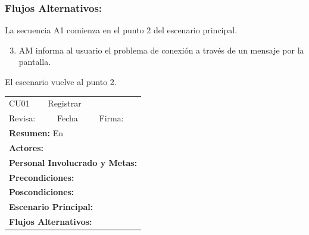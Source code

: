\begin{framed}
\subsubsection{Flujos Alternativos: }

La secuencia A1 comienza en el punto 2 del escenario principal.
\begin{enumerate}
    \setcounter{enumi}{2}
    \item AM informa al usuario el problema de conexión a través de un mensaje por la pantalla.
\end{enumerate}
El escenario vuelve al punto 2.

\end{framed}




\begin{longtable}{|l|p{5.5cm}|l|p{2cm}|l|p{1.9cm}|} \hline
    \cellcolor{grisOscuro} CU01 & \multicolumn{4}{|l|}{  \cellcolor{grisOscuro} Registrar} &  \cellcolor{grisClaro}\multirow{2}{1cm}{} \\ \cline{1-5}
    \cellcolor{grisOscuro} Revisa: &  \cellcolor{grisClaro} &  \cellcolor{grisOscuro} Fecha &  \cellcolor{grisClaro} &  \cellcolor{grisOscuro} Firma: & \cellcolor{grisClaro} \\ \hline
    \multicolumn{6}{|p{15cm}|}{ \textbf{Resumen: } En

    } \\ \hline

    \multicolumn{6}{|p{15cm}|}{ \textbf{Actores: }

    } \\ \hline

    \multicolumn{6}{|p{15cm}|}{ \textbf{Personal Involucrado y Metas: }

    } \\ \hline

    \multicolumn{6}{|p{15cm}|}{ \textbf{Precondiciones: }

    } \\ \hline

    \multicolumn{6}{|p{15cm}|}{ \textbf{Poscondiciones: }

    } \\ \hline

    \multicolumn{6}{|p{15cm}|}{ \textbf{Escenario Principal: }

    } \\ \hline

    \multicolumn{6}{|p{15cm}|}{ \textbf{Flujos Alternativos: }

    } \\ \hline

\end{longtable}



